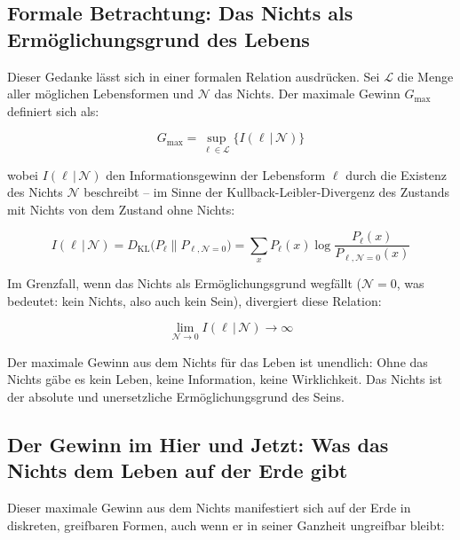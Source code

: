 ﻿\documentclass[12pt,a4paper]{report}
\begin{document}
\subsection{Formale Betrachtung: Das Nichts als Ermöglichungsgrund des Lebens}

Dieser Gedanke lässt sich in einer formalen Relation ausdrücken. Sei $\mathcal{L}$ die Menge aller möglichen Lebensformen und $\mathcal{N}$ das Nichts. Der maximale Gewinn $G_{\max}$ definiert sich als:

\begin{equation}
	G_{\max} = \sup_{\ell \in \mathcal{L}} \bigl\{I(\ell\,|\,\mathcal{N})\bigr\}
	\label{eq:max_gewinn}
\end{equation}

wobei $I(\ell\,|\,\mathcal{N})$ den Informationsgewinn der Lebensform $\ell$ durch die Existenz des Nichts $\mathcal{N}$ beschreibt -- im Sinne der Kullback-Leibler-Divergenz des Zustands mit Nichts von dem Zustand ohne Nichts:

\begin{equation}
	I(\ell\,|\,\mathcal{N}) = D_{\text{KL}}\bigl(P_\ell \| P_{\ell,\mathcal{N}=0}\bigr) = \sum_x P_\ell(x) \log \frac{P_\ell(x)}{P_{\ell,\mathcal{N}=0}(x)}
	\label{eq:kl_divergenz}
\end{equation}

Im Grenzfall, wenn das Nichts als Ermöglichungsgrund wegfällt ($\mathcal{N} = 0$, was bedeutet: kein Nichts, also auch kein Sein), divergiert diese Relation:

\begin{equation}
	\lim_{\mathcal{N} \to 0} I(\ell\,|\,\mathcal{N}) \to \infty
	\label{eq:divergenz_ohne_nichts}
\end{equation}

Der maximale Gewinn aus dem Nichts für das Leben ist unendlich: Ohne das Nichts gäbe es kein Leben, keine Information, keine Wirklichkeit. Das Nichts ist der absolute und unersetzliche Ermöglichungsgrund des Seins.

\subsection{Der Gewinn im Hier und Jetzt: Was das Nichts dem Leben auf der Erde gibt}

Dieser maximale Gewinn aus dem Nichts manifestiert sich auf der Erde in diskreten, greifbaren Formen, auch wenn er in seiner Ganzheit ungreifbar bleibt:
\end{document}
